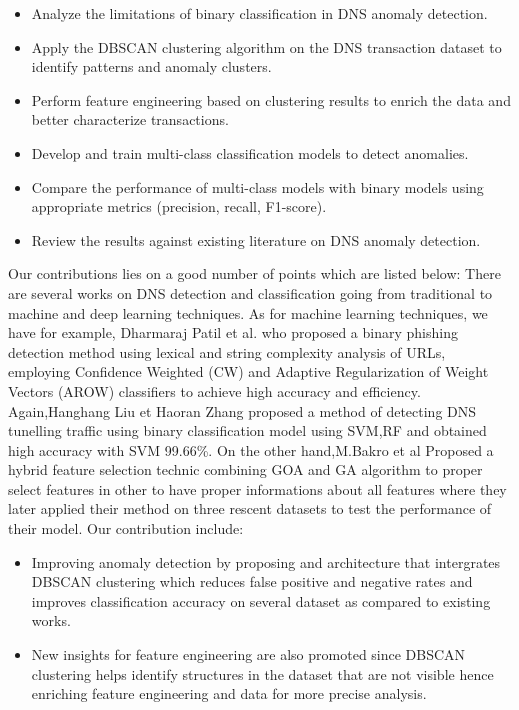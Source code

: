 \begin{itemize}
    \item Analyze the limitations of binary classification in DNS anomaly detection.

\item  Apply the DBSCAN clustering algorithm on the DNS transaction dataset to identify patterns and anomaly clusters.\\
\item Perform feature engineering based on clustering results to enrich the data and better characterize transactions.\\
\item Develop and train multi-class classification models to detect anomalies.\\
\item Compare the performance of multi-class models with binary models using appropriate metrics (precision, recall, F1-score).\\
\item Review the results against existing literature on DNS anomaly detection.
\end{itemize}
Our contributions lies on a good number of points which are listed below:
There are several works on DNS detection and classification going from traditional to
machine and deep learning techniques. As for machine learning techniques, we have
for example, Dharmaraj Patil et al.\cite{basnet2012learning} who proposed a binary phishing detection method using lexical and string complexity analysis of URLs, employing Confidence Weighted (CW) and Adaptive Regularization of Weight Vectors (AROW) classifiers to achieve high accuracy and efficiency. Again,Hanghang Liu et Haoran Zhang\cite{liu2020detecting}
proposed a method of detecting DNS tunelling traffic using binary classification model using SVM,RF and obtained high accuracy with SVM 99.66\%. On the other hand,M.Bakro et al \cite{moustafa2021building}Proposed a hybrid feature selection technic combining GOA and GA algorithm to proper select features in other to have proper informations about all features where they later applied their method on three rescent datasets to test the performance of their model. 
Our contribution include:\\
\begin{itemize}
    \item{Improving anomaly detection by proposing and architecture that intergrates DBSCAN clustering which reduces false positive and negative rates and improves classification accuracy on several dataset as compared to existing works. }\\
\end{itemize}
  \begin{itemize}
      \item{New insights for feature engineering are also promoted since DBSCAN clustering helps identify structures in the dataset that are not visible hence enriching feature engineering and data for more precise analysis.}
  \end{itemize}
    
